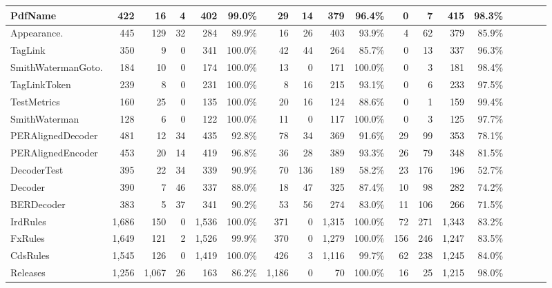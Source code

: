 \begin{table*}[t]
\begin{SmallOut}
\begin {tabular} {|l|r|r|r|r|r|r|r|r|r|r|r|r|r|r|r|r|r|}
\hline
  PdfName                      & 422  & 16   & 4  & 402 & 99.0\% & 29 & 14  & 379 & 96.4\% & 0  & 7 & 415  & 98.3\%\\
\hline
  Appearance.    & 445  & 129 & 32 & 284 & 89.9\% & 16 & 26 & 403 & 93.9\% & 4  & 62& 379  & 85.9\%\\
\hline\hline
  TagLink                      & 350  & 9   & 0  & 341 & 100.0\%& 42 & 44 & 264 & 85.7\% & 0  & 13 & 337  & 96.3\%\\
\hline
SmithWatermanGoto.             & 184 & 10   & 0 & 174  & 100.0\%& 13 & 0  & 171 & 100.0\%& 0  & 3 & 181  & 98.4\%\\
\hline
  TagLinkToken                 & 239 & 8   & 0  & 231 & 100.0\%& 8  & 16  & 215 & 93.1\% & 0  & 6 & 233  & 97.5\%\\
\hline
  TestMetrics                  & 160 & 25  & 0  & 135 & 100.0\%& 20 & 16  & 124 & 88.6\% & 0  & 1 & 159  & 99.4\%\\
\hline
  SmithWaterman                & 128 & 6   & 0  & 122 & 100.0\%& 11 & 0  & 117 & 100.0\%& 0  & 3 & 125  & 97.7\%\\
\hline\hline
  PERAlignedDecoder            & 481 & 12  & 34 & 435 & 92.8\% & 78 & 34 & 369 & 91.6\% & 29 & 99 & 353 & 78.1\%\\
\hline
  PERAlignedEncoder            & 453 & 20  & 14 & 419 & 96.8\% & 36 & 28 & 389 & 93.3\% & 26 & 79 & 348 & 81.5\%\\
\hline
  DecoderTest                  & 395  & 22 & 34 & 339 & 90.9\% & 70 & 136& 189 & 58.2\% & 23 & 176& 196 & 52.7\%\\
\hline
  Decoder                      & 390  & 7  & 46 & 337 & 88.0\% & 18 & 47  & 325& 87.4\% & 10 & 98 & 282 & 74.2\%\\
\hline
  BERDecoder                   & 383  & 5  & 37 & 341 & 90.2\% & 53 & 56  & 274& 83.0\% & 11 & 106& 266 & 71.5\%\\
\hline\hline
  IrdRules                     & 1,686 & 150& 0 & 1,536& 100.0\%& 371 & 0 & 1,315 & 100.0\%& 72 &271  & 1,343 & 83.2\%\\
\hline
  FxRules                      & 1,649 & 121& 2 & 1,526& 99.9\% & 370 & 0  & 1,279& 100.0\%& 156& 246& 1,247 & 83.5\%\\
\hline
  CdsRules                     & 1,545 & 126& 0 & 1,419& 100.0\%& 426 & 3  & 1,116 & 99.7\% & 62 & 238& 1,245& 84.0\%\\
\hline
  Releases                     & 1,256 &1,067& 26 & 163 & 86.2\% & 1,186& 0  & 70  & 100.0\%& 16  & 25 & 1,215& 98.0\%\\

\end{tabular}
\end{SmallOut}
\end{table*}
